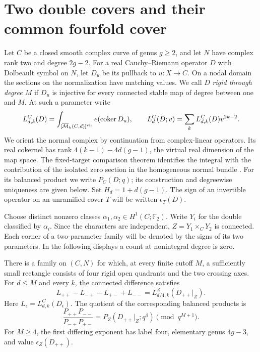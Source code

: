 \section{Two double covers and their common fourfold cover}\label{sec:square}

Let $C$ be a closed smooth complex curve of genus $g\ge2$, and let $N$
have complex rank two and degree $2g-2$. For a real Cauchy--Riemann
operator $D$ with Dolbeault symbol on $N$, let $D_u$ be its pullback
to $u:X\to C$. On a nodal domain the sections on the normalization
have matching values. We call $D$ \emph{rigid through degree $M$} if
$D_u$ is injective for every connected stable map of degree between
one and $M$. At such a parameter write
\begin{equation}\label{eq:fixed}
L^C_{d,k}(D)=\int_{[\overline{\mathcal M}_{k}(C,d)]^{\rm vir}}
            e(\operatorname{coker}D_u),\qquad
 L^C_d(D;v)=\sum_k L^C_{d,k}(D)v^{2k-2}.
\end{equation}
We orient the normal complex by continuation from complex-linear
operators. Its real cokernel has rank $4(k-1)-4d(g-1)$, the virtual
real dimension of the map space. The fixed-target comparison theorem
identifies the integral with the contribution of the isolated
zero section in the homogeneous normal bundle
\cite[Theorem~1.2]{zinger}. For its balanced product we write $P_C(D;q)$;
its construction and degreewise uniqueness are given below.
Set $H_d=1+d(g-1)$. The sign of an invertible operator on an unramified
cover $T$ will be written $\epsilon_T(D)$.

Choose distinct nonzero classes $\alpha_1,\alpha_2\in H^1(C;\mathbb F_2)$.
Write $Y_i$ for the double classified by $\alpha_i$. Since the characters
are independent, $Z=Y_1\times_CY_2$ is connected. Each corner of a
two-parameter family will be denoted by the signs of its two parameters.
In the following displays a count at nonintegral degree is zero.
\begin{theorem}\label{thm:square}
There is a family on $(C,N)$ for which, at every finite cutoff $M$,
a sufficiently small rectangle consists of four rigid open quadrants
and the two crossing axes. For $d\le M$ and every $k$, the connected
difference satisfies
\[
 L_{++}-L_{-+}-L_{+-}+L_{--}
      = L^{Z}_{d/4,k}(D_{++}|_Z).
\]
Here $L_\epsilon=L^C_{d,k}(D_\epsilon)$. The quotient of the corresponding
balanced products is
\[
 \frac{P_{++}P_{--}}{P_{-+}P_{+-}}=P_Z(D_{++}|_Z;q^4)
          \pmod {q^{M+1}} .
\]
For $M\ge4$, the first differing exponent has label four, elementary
genus $4g-3$, and value $\epsilon_Z(D_{++})$.
\end{theorem}

